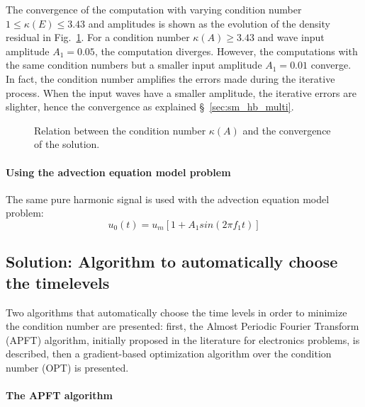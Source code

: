 The convergence of the computation with varying condition number 
$1 \leq \kappa (E) \leq 3.43$ and
amplitudes is shown as the evolution of the density residual in 
Fig.~\ref{fig:canal_residual_vs_conditionning}.
For a condition number $\kappa (A) \geq 3.43$ and wave input amplitude
$A_1 = 0.05$, the computation diverges. However, the computations with
the same condition numbers but a smaller input amplitude $A_1 = 0.01$
converge. In fact, the condition number amplifies the errors made
during the iterative process. When the input waves have a smaller
amplitude, the iterative errors are slighter, hence the convergence as
explained \S~\ref{sec:sm_hb_multi}.
\begin{figure}[htb]
  \centering {}
  \quad
  \caption{Relation between the condition number $\kappa (A)$ and the
    convergence of the solution.}
  \label{fig:canal_residual_vs_conditionning}
\end{figure}

\paragraph{Using the advection equation model problem}
The same pure harmonic signal is used with the advection equation
model problem:
\begin{equation}
   u_0 (t) = u_m \left[ 1 + A_1 sin \left(2 \pi f_1 t\right) \right]
\end{equation}


\subsection{Solution: Algorithm to automatically choose the timelevels} %
\label{sec:algorithm_to_automatically_choose_the_timelevels}

Two algorithms that automatically choose the time levels in order to
minimize the condition number are presented: first, the Almost
Periodic Fourier Transform (APFT) algorithm, initially proposed in the
 literature for electronics problems, is described, then a gradient-based
optimization algorithm over the condition number (OPT) is presented.

\paragraph{The APFT algorithm}
\label{sec:apft_algorithm}

